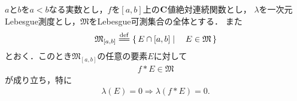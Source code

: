 	\begin{screen}
		\begin{thm}[絶対連続な非減少関数は可測集合を可測集合に写す]
			$a$と$b$を$a<b$なる実数とし，$f$を$[a,b]$上の$\mathbf{C}$値絶対連続関数とし，
			$\lambda$を一次元Lebesgue測度とし，$\mathfrak{M}$をLebesgue可測集合の全体とする．
			また
			\begin{align}
				\mathfrak{M}_{[a,b]} \defeq \Set{E \cap [a,b]}{E \in \mathfrak{M}}
			\end{align}
			とおく．このとき$\mathfrak{M}_{[a,b]}$の任意の要素$E$に対して
			\begin{align}
				f \ast E \in \mathfrak{M}
			\end{align}
			が成り立ち，特に
			\begin{align}
				\lambda(E) = 0 \Longrightarrow \lambda(f \ast E) = 0.
			\end{align}
		\end{thm}
	\end{screen}
	
